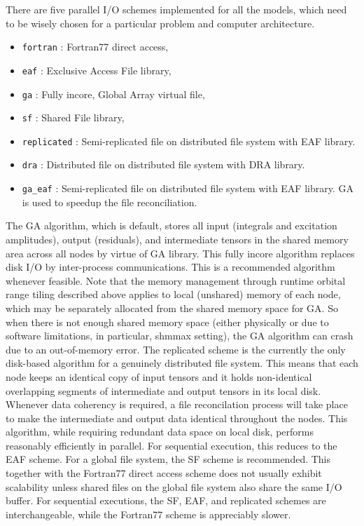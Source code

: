 There are five parallel I/O schemes implemented for all the models, which need to be
wisely chosen for a particular problem and computer architecture. 
\begin{itemize}
\item \verb+fortran+ : Fortran77 direct access,
\item \verb+eaf+ : Exclusive Access File library,
\item \verb+ga+ : Fully incore, Global Array virtual file,
\item \verb+sf+ : Shared File library,
\item \verb+replicated+ : Semi-replicated file on distributed file system with EAF library.
\item \verb+dra+ : Distributed file on distributed file system with DRA library.
\item \verb+ga_eaf+ : Semi-replicated file on distributed file system with EAF library. GA is used 
to speedup the file reconciliation.
\end{itemize}
The GA algorithm, which is default, stores all input (integrals and
excitation amplitudes), output (residuals), and intermediate tensors in the shared memory area
across all nodes by virtue of GA library.  This fully incore algorithm replaces disk I/O by
inter-process communications.  This is a recommended algorithm whenever feasible.  Note that 
the memory management through runtime orbital range tiling described above applies to local
(unshared) memory of each node, which may be separately allocated from the shared memory space
for GA.  So when there is not enough shared memory space (either physically or due to software
limitations, in particular, shmmax setting), the GA algorithm can crash due to an out-of-memory error.
The replicated scheme is the currently the only disk-based algorithm for a genuinely distributed
file system.  This means that each node keeps an identical copy of input tensors and
it holds non-identical overlapping segments of intermediate and output tensors in its local disk.
Whenever data coherency is required, a file reconcilation process will take place to make the intermediate
and output data identical throughout the nodes.  This algorithm, while requiring redundant data space on
local disk, performs reasonably efficiently in parallel.  For sequential execution, this reduces 
to the EAF scheme.  For a global file system, the SF scheme is recommended.  This together with
the Fortran77 direct access scheme does not usually exhibit scalability unless shared files on
the global file system also share the same I/O buffer.  For sequential executions, the 
SF, EAF, and replicated schemes are interchangeable, while the Fortran77 scheme is appreciably
slower.

